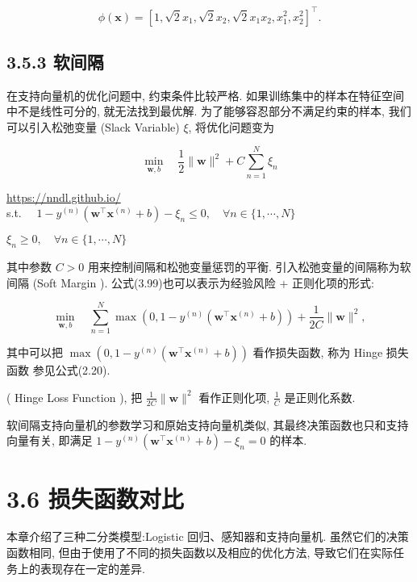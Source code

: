 \documentclass[10pt]{article}
\begin{document}
\begin{equation*}
\phi(\boldsymbol{x})=\left[1, \sqrt{2} x_{1}, \sqrt{2} x_{2}, \sqrt{2} x_{1} x_{2}, x_{1}^{2}, x_{2}^{2}\right]^{\top} . \tag{3.98}
\end{equation*}


\subsection*{3.5.3 软间隔}
在支持向量机的优化问题中, 约束条件比较严格. 如果训练集中的样本在特征空间中不是线性可分的, 就无法找到最优解. 为了能够容忍部分不满足约束的样本, 我们可以引入松弛变量 (Slack Variable) $\xi$, 将优化问题变为


\begin{equation*}
\min _{\boldsymbol{w}, b} \quad \frac{1}{2}\|\boldsymbol{w}\|^{2}+C \sum_{n=1}^{N} \xi_{n} \tag{3.99}
\end{equation*}


\href{https://nndl.github.io/}{https://nndl.github.io/}\\
s.t. $\quad 1-y^{(n)}\left(\boldsymbol{w}^{\top} \boldsymbol{x}^{(n)}+b\right)-\xi_{n} \leq 0, \quad \forall n \in\{1, \cdots, N\}$

$\xi_{n} \geq 0, \quad \forall n \in\{1, \cdots, N\}$

其中参数 $C>0$ 用来控制间隔和松弛变量惩罚的平衡. 引入松弛变量的间隔称为软间隔 (Soft Margin ). 公式(3.99)也可以表示为经验风险 + 正则化项的形式:


\begin{equation*}
\min _{\boldsymbol{w}, b} \quad \sum_{n=1}^{N} \max \left(0,1-y^{(n)}\left(\boldsymbol{w}^{\top} \boldsymbol{x}^{(n)}+b\right)\right)+\frac{1}{2 C}\|\boldsymbol{w}\|^{2}, \tag{3.100}
\end{equation*}


其中可以把 $\max \left(0,1-y^{(n)}\left(\boldsymbol{w}^{\top} \boldsymbol{x}^{(n)}+b\right)\right)$ 看作损失函数, 称为 Hinge 损失函数 参见公式(2.20).

( Hinge Loss Function ), 把 $\frac{1}{2 C}\|\boldsymbol{w}\|^{2}$ 看作正则化项, $\frac{1}{C}$ 是正则化系数.

软间隔支持向量机的参数学习和原始支持向量机类似, 其最终决策函数也只和支持向量有关, 即满足 $1-y^{(n)}\left(\boldsymbol{w}^{\top} \boldsymbol{x}^{(n)}+b\right)-\xi_{n}=0$ 的样本.

\section*{3.6 损失函数对比}
本章介绍了三种二分类模型:Logistic 回归、感知器和支持向量机. 虽然它们的决策函数相同, 但由于使用了不同的损失函数以及相应的优化方法, 导致它们在实际任务上的表现存在一定的差异.
\end{document}
